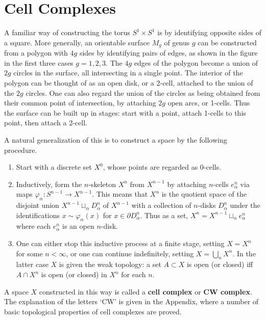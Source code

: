 \section{Cell Complexes}
\label{sec:cell-complexes}

A familiar way of constructing the torus $S^1 \times S^1$ is by identifying opposite sides
of a square. More generally, an orientable surface $M_g$ of genus $g$ can be constructed
from a polygon with $4g$ sides by identifying pairs of edges, as shown in the figure in
the first three cases $g = 1,2,3$. The $4g$ edges of the polygon become a union of $2g$
circles in the surface, all intersecting in a single point. The interior of the polygon can
be thought of as an open disk, or a 2-cell, attached to the union of the $2g$ circles. One
can also regard the union of the circles as being obtained from their common point of
intersection, by attaching $2g$ open arcs, or 1-cells. Thus the surface can be built up
in stages: start with a point, attach 1-cells to this point, then attach a 2-cell.



A natural generalization of this is to construct a space by the following procedure.

\begin{definition}[CW complex]
\label{def:cell-complex}
\leanok
\begin{enumerate}
\item[(1)] Start with a discrete set $X^0$, whose points are regarded as 0-cells.
\item[(2)] Inductively, form the $n$-skeleton $X^n$ from $X^{n-1}$ by attaching $n$-cells
$e_\alpha^n$ via maps $\varphi_\alpha : S^{n-1} \to X^{n-1}$. This means that $X^n$ is the quotient
space of the disjoint union $X^{n-1} \sqcup_\alpha D_\alpha^n$ of $X^{n-1}$ with a collection of $n$-disks
$D_\alpha^n$ under the identifications $x \sim \varphi_\alpha(x)$ for $x \in \partial D_\alpha^n$. Thus as a set,
$X^n = X^{n-1} \sqcup_\alpha e_\alpha^n$ where each $e_\alpha^n$ is an open $n$-disk.
\item[(3)] One can either stop this inductive process at a finite stage, setting $X = X^n$
for some $n < \infty$, or one can continue indefinitely, setting $X = \bigcup_n X^n$. In the
latter case $X$ is given the weak topology: a set $A \subset X$ is open (or closed) iff
$A \cap X^n$ is open (or closed) in $X^n$ for each $n$.
\end{enumerate}
A space $X$ constructed in this way is called a \textbf{cell complex} or \textbf{CW complex}.
The explanation of the letters `CW' is given in the Appendix, where a number of basic
topological properties of cell complexes are proved.
\end{definition}

